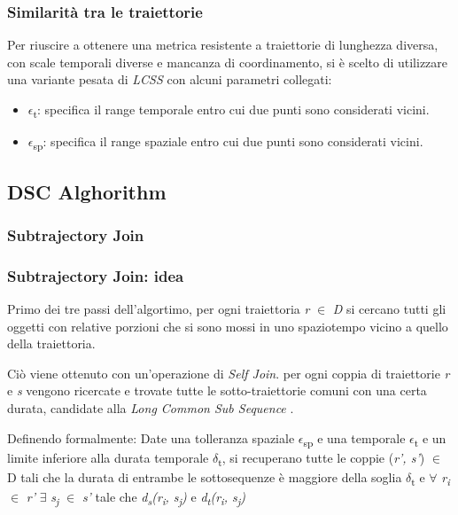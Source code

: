 \documentclass{beamer}
\begin{document}
\begin{frame}
	\frametitle{Similarità tra le traiettorie}
	Per riuscire a ottenere una metrica resistente a traiettorie di lunghezza diversa, con scale temporali diverse e mancanza di coordinamento, si è scelto di utilizzare una variante pesata di \textit{LCSS} con alcuni parametri collegati:
	\begin{itemize}
		\item $\epsilon$\textsubscript{t}: specifica il range temporale entro cui due punti sono considerati vicini.
			\item $\epsilon$\textsubscript{sp}: specifica il range spaziale entro cui due punti sono considerati vicini.
	\end{itemize}
\end{frame}


\subsection{DSC Alghorithm}

\subsubsection{Subtrajectory Join}

\begin{frame}
	\frametitle{Subtrajectory Join: idea}
	Primo dei tre passi dell'algortimo, per ogni traiettoria \textit{r} $\in$ \textit{D} si cercano tutti gli oggetti con relative porzioni che si sono mossi in uno spaziotempo vicino a quello della traiettoria.
	
	Ciò viene ottenuto con un'operazione di \textit{Self Join}. per ogni coppia di traiettorie \textit{r} e \textit{s} vengono ricercate e trovate tutte le sotto-traiettorie comuni con una certa durata, candidate alla \textit{Long Common Sub Sequence} .
	
	Definendo formalmente: Date una tolleranza spaziale  $\epsilon$\textsubscript{sp} e una temporale  $\epsilon$\textsubscript{t} e un limite inferiore alla durata temporale $\delta$\textsubscript{t}, si recuperano tutte le coppie (\textit{r', s'}) $\in$ D tali che 
	la durata di entrambe le sottosequenze è maggiore della soglia $\delta$\textsubscript{t} e
	$\forall$ \textit{r\textsubscript{i}} $\in$ \textit{r'} $\exists$ \textit{s\textsubscript{j}} $\in$ 
	\textit{s'} tale che \textit{d\textsubscript{s}(r\textsubscript{i}, s\textsubscript{j})} e 
	\textit{d\textsubscript{t}(r\textsubscript{i}, s\textsubscript{j})}
\end{frame}
\end{document}
